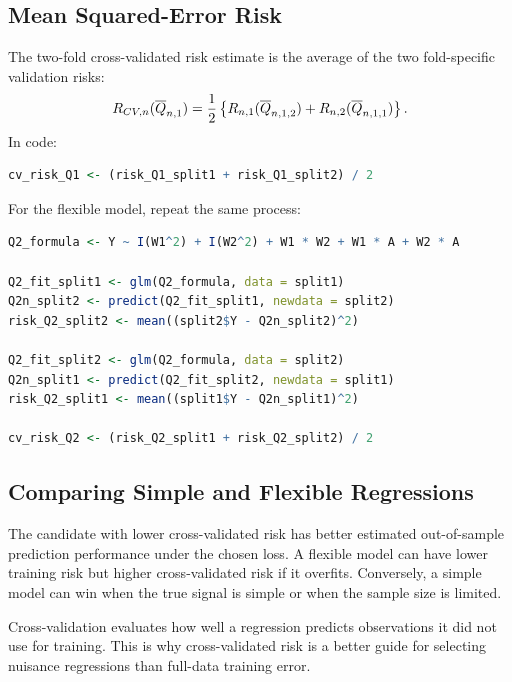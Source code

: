 \subsection{Mean Squared-Error Risk}

The two-fold cross-validated risk estimate is the average of the two fold-specific
validation risks:
\[
R_{CV,n}(\overline{Q}_{n,1})
=
\frac{1}{2}\left\{
R_{n,1}(\overline{Q}_{n,1,2})+
R_{n,2}(\overline{Q}_{n,1,1})
\right\}.
\]
In code:

\begin{implementationbox}
\begin{lstlisting}[language=R]
cv_risk_Q1 <- (risk_Q1_split1 + risk_Q1_split2) / 2
\end{lstlisting}
\end{implementationbox}

For the flexible model, repeat the same process:

\begin{implementationbox}
\begin{lstlisting}[language=R]
Q2_formula <- Y ~ I(W1^2) + I(W2^2) + W1 * W2 + W1 * A + W2 * A

Q2_fit_split1 <- glm(Q2_formula, data = split1)
Q2n_split2 <- predict(Q2_fit_split1, newdata = split2)
risk_Q2_split2 <- mean((split2$Y - Q2n_split2)^2)

Q2_fit_split2 <- glm(Q2_formula, data = split2)
Q2n_split1 <- predict(Q2_fit_split2, newdata = split1)
risk_Q2_split1 <- mean((split1$Y - Q2n_split1)^2)

cv_risk_Q2 <- (risk_Q2_split1 + risk_Q2_split2) / 2
\end{lstlisting}
\end{implementationbox}

\subsection{Comparing Simple and Flexible Regressions}

The candidate with lower cross-validated risk has better estimated out-of-sample
prediction performance under the chosen loss. A flexible model can have lower
training risk but higher cross-validated risk if it overfits. Conversely, a simple model
can win when the true signal is simple or when the sample size is limited.

\begin{keyidea}
Cross-validation evaluates how well a regression predicts observations it did not use
for training. This is why cross-validated risk is a better guide for selecting nuisance
regressions than full-data training error.
\end{keyidea}
